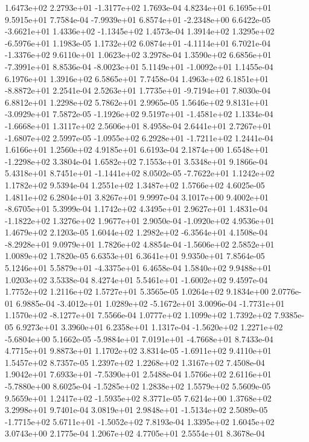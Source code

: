  1.6473e+02  2.2793e+01 -1.3177e+02  1.7693e-04
4.8234e+01 6.1695e+01 9.5915e+01  7.7584e-04
-7.9939e+01  6.8574e+01 -2.2348e+00  6.6422e-05
-3.6621e+01  1.4336e+02 -1.1345e+02  1.4573e-04
 1.3914e+02  1.3295e+02 -6.5976e+01  1.1983e-05
 1.1732e+02  6.0874e+01 -4.1114e+01  6.7021e-04
-1.3376e+02  9.6110e+01  1.0623e+02  3.2978e-04
 1.3590e+02  6.6856e+01 -7.3991e+01  8.8536e-04
-8.0023e+01  5.1149e+01 -1.0092e+01  1.1455e-04
6.1976e+01 1.3916e+02 6.5865e+01  7.7458e-04
 1.4963e+02  6.1851e+01 -8.8872e+01  2.2541e-04
 2.5263e+01  1.7735e+01 -9.7194e+01  7.8030e-04
6.8812e+01 1.2298e+02 5.7862e+01  2.9965e-05
 1.5646e+02  9.8131e+01 -3.0929e+01  7.5872e-05
-1.1926e+02  9.5197e+01 -1.4581e+02  1.1334e-04
-1.6668e+01  1.3117e+02  2.5606e+01  8.4958e-04
 2.6441e+01  2.7267e+01 -1.6807e+02  2.5997e-05
-1.0955e+02  6.2928e+01 -1.7211e+02  1.2441e-04
1.6166e+01 1.2560e+02 4.9185e+01  6.6193e-04
 2.1874e+00  1.6548e+01 -1.2298e+02  3.3804e-04
1.6582e+02 7.1553e+01 3.5348e+01  9.1866e-04
 5.4318e+01  8.7451e+01 -1.1441e+02  8.0502e-05
-7.7622e+01  1.1242e+02  1.1782e+02  9.5394e-04
1.2551e+02 1.3487e+02 1.5766e+02  4.6025e-05
1.4811e+02 6.2804e+01 3.8267e+01  9.9997e-04
 3.1017e+00  9.4002e+01 -8.6705e+01  5.3999e-04
1.1742e+02 4.3495e+01 2.9627e+01  1.4831e-04
-1.1822e+02  1.3276e+02  1.9677e+01  2.9050e-04
-1.0920e+02  4.9536e+01  1.4679e+02  2.1203e-05
 1.6044e+02  1.2982e+02 -6.3564e+01  4.1508e-04
-8.2928e+01  9.0979e+01  1.7826e+02  4.8854e-04
-1.5606e+02  2.5852e+01  1.0089e+02  1.7820e-05
6.6353e+01 6.3641e+01 9.9350e+01  7.8564e-05
 5.1246e+01  5.5879e+01 -4.3375e+01  6.4658e-04
1.5840e+02 9.9488e+01 1.0203e+02  3.5338e-04
 8.4274e+01  5.5461e+01 -1.6002e+02  9.4597e-04
1.7752e+02 1.2116e+02 1.5727e+01  5.3565e-05
1.0264e+02 9.1834e+00 2.0776e-01  6.9885e-04
-3.4012e+01  1.0289e+02 -5.1672e+01  3.0096e-04
-1.7731e+01  1.1570e+02 -8.1277e+01  7.5566e-04
1.0777e+02 1.1099e+02 1.7392e+02  7.9385e-05
6.9273e+01 3.3960e+01 6.2358e+01  1.1317e-04
-1.5620e+02  1.2271e+02 -5.6804e+00  5.1662e-05
-5.9884e+01  7.0191e+01 -4.7668e+01  8.7433e-04
4.7715e+01 9.8873e+01 1.1702e+02  3.8314e-05
-1.6911e+02  9.4110e+01  1.5457e+02  8.7357e-05
1.2397e+02 1.2268e+02 1.3167e+02  7.4508e-04
 1.9042e+01  7.6933e+01 -7.5390e+01  2.5488e-04
 1.5766e+02  2.6116e+01 -5.7880e+00  8.6025e-04
-1.5285e+02  1.2838e+02  1.5579e+02  5.5609e-05
 9.5659e+01  1.2417e+02 -1.5935e+02  8.3771e-05
7.6214e+00 1.3768e+02 3.2998e+01  9.7401e-04
 3.0819e+01  2.9848e+01 -1.5134e+02  2.5089e-05
-1.7715e+02  5.6711e+01 -1.5052e+02  7.8193e-04
1.3395e+02 1.6045e+02 3.0743e+00  2.1775e-04
1.2067e+02 4.7705e+01 2.5554e+01  8.3678e-04
